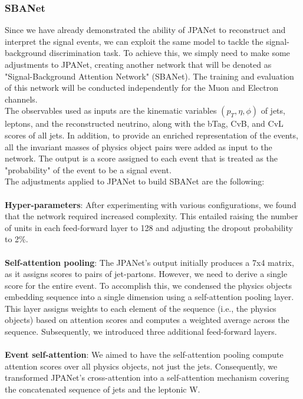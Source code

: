 \subsubsection*{SBANet} Since we have already demonstrated the ability of JPANet to reconstruct and interpret the signal events, we can exploit the same model to tackle the signal-background discrimination task.
To achieve this, we simply need to make some adjustments to JPANet, creating another network that will be denoted as "Signal-Background Attention Network" (SBANet).
The training and evaluation of this network will be conducted independently for the Muon and Electron channels.\\
The observables used as inputs are the kinematic variables $(p_T,\eta,\phi)$ of jets, leptons, and the reconstructed neutrino, along with the bTag, CvB, and CvL scores of all jets.
In addition, to provide an enriched representation of the events, all the invariant masses of physics object pairs were added as input to the network. The output is a score assigned to each event that is treated as the "probability" of the event to be a signal event.
\\
The adjustments applied to JPANet to build SBANet are the following:\\
\\
\textbf{Hyper-parameters}: After experimenting with various configurations, we found that the network required increased complexity. This entailed raising the number of units in each feed-forward layer to 128 and adjusting the dropout probability to 2\%.
\\
\\
\textbf{Self-attention pooling}: The JPANet's output initially produces a 7x4 matrix, as it assigns scores to pairs of jet-partons. However, we need to derive a single score for the entire event. To accomplish this, we condensed the physics objects embedding sequence into a single dimension using a self-attention pooling layer. This layer assigns weights to each element of the sequence (i.e., the physics objects) based on attention scores and computes a weighted average across the sequence. Subsequently, we introduced three additional feed-forward layers.
\\
\\
\textbf{Event self-attention}: We aimed to have the self-attention pooling compute attention scores over all physics objects, not just the jets. Consequently, we transformed JPANet's cross-attention into a self-attention mechanism covering the concatenated sequence of jets and the leptonic W.
